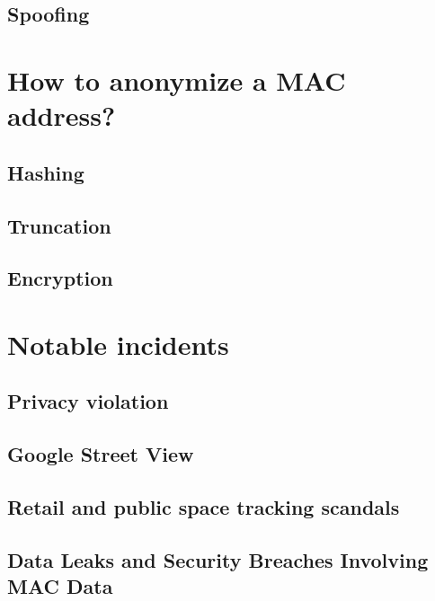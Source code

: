 \documentclass[aps,prb,twocolumn,superscriptaddress,floatfix,longbibliography,nofootinbib]{revtex4-2}
\begin{document}
  \subsection{\label{subsec:Spoofing}Spoofing}

\section{\label{sec:Methods}How to anonymize a MAC address?}
  \subsection{\label{subsec:Hashing}Hashing}
  \subsection{\label{subsec:Truncation}Truncation}
  \subsection{\label{subsec:Encryption}Encryption}

\section{\label{sec:Notable incidents}Notable incidents}
  \subsection{\label{subsec:Nordstrom}Privacy violation}

  \subsection{\label{subsec:Google}Google Street View}
  \subsection{\label{subsec:London}Retail and public space tracking scandals}
  \subsection{\label{subsec:DataLeaks}Data Leaks and Security Breaches Involving MAC Data}
\end{document}
